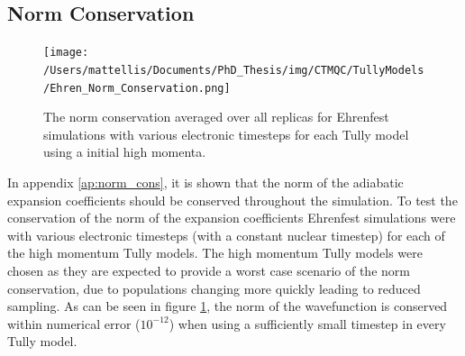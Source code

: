 \subsection{Norm Conservation}
\label{sect:normConsEhren}
\begin{figure}[ht]
	\texttt{[image: /Users/mattellis/Documents/PhD\_Thesis/img/CTMQC/TullyModels/Ehren\_Norm\_Conservation.png]}
	\caption{\label{fig:EhrenNormCons}The norm conservation averaged over all replicas for Ehrenfest simulations with various electronic timesteps for each Tully model using a initial high momenta.}
\end{figure}
\noindent In appendix \ref{ap:norm_cons}, it is shown that the norm of the adiabatic expansion coefficients should be conserved throughout the simulation. To test the conservation of the norm of the expansion coefficients Ehrenfest simulations were  with various electronic timesteps (with a constant nuclear timestep) for each of the  high momentum Tully models. The high momentum Tully models were chosen as they are expected to provide a worst case scenario of the norm conservation, due to populations changing more quickly leading to reduced sampling. As can be seen in figure \ref{fig:EhrenNormCons}, the norm of the wavefunction is conserved within numerical error ($10^{-12}$) when     using a sufficiently small timestep in every Tully model.

